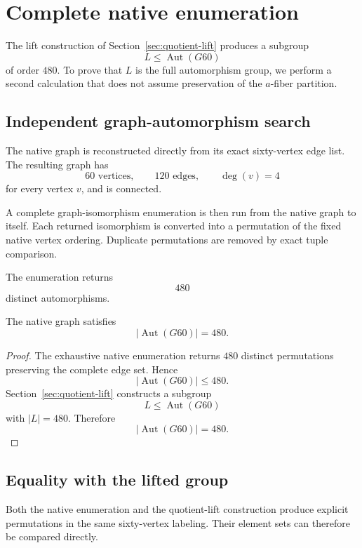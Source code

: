 \section{Complete native enumeration}
\label{sec:complete-enumeration}

The lift construction of Section~\ref{sec:quotient-lift} produces a
subgroup
\[
L\leq\operatorname{Aut}(G60)
\]
of order $480$. To prove that $L$ is the full automorphism group, we
perform a second calculation that does not assume preservation of the
$a$-fiber partition.

\subsection{Independent graph-automorphism search}

The native graph is reconstructed directly from its exact sixty-vertex
edge list. The resulting graph has
\[
60\text{ vertices},
\qquad
120\text{ edges},
\qquad
\deg(v)=4
\]
for every vertex $v$, and is connected.

A complete graph-isomorphism enumeration is then run from the native
graph to itself. Each returned isomorphism is converted into a
permutation of the fixed native vertex ordering. Duplicate permutations
are removed by exact tuple comparison.

The enumeration returns
\[
480
\]
distinct automorphisms.

\begin{theorem}
\label{thm:native-order}
The native graph satisfies
\[
\left|\operatorname{Aut}(G60)\right|=480.
\]
\end{theorem}

\begin{proof}
The exhaustive native enumeration returns $480$ distinct permutations
preserving the complete edge set. Hence
\[
\left|\operatorname{Aut}(G60)\right|\leq480.
\]
Section~\ref{sec:quotient-lift} constructs a subgroup
\[
L\leq\operatorname{Aut}(G60)
\]
with $|L|=480$. Therefore
\[
\left|\operatorname{Aut}(G60)\right|=480.
\]
\end{proof}

\subsection{Equality with the lifted group}

Both the native enumeration and the quotient-lift construction produce
explicit permutations in the same sixty-vertex labeling. Their element
sets can therefore be compared directly.

